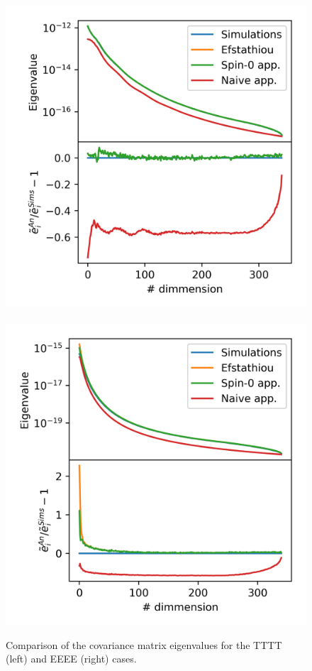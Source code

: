 \documentclass[a4paper,11pt]{article}
\begin{document}
\begin{figure} %
  \centering
  \includegraphics[width=\columnwidth]{./figures/run_sph_ALL_TTTT_reldev_eigval.png}~
  \includegraphics[width=\columnwidth]{./figures/run_sph_ALL_EEEE_reldev_eigval.png}
  \caption{Comparison of the covariance matrix eigenvalues for the TTTT (left)
    and EEEE (right) cases.} 
  \label{fig:TTTT_EEEE_eigv}
\end{figure}
\end{document}
